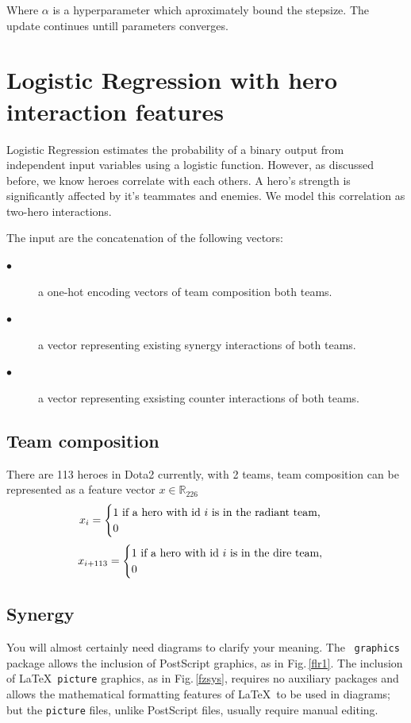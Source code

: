 \documentclass[12pt,openany,a4paper]{book}
\newcommand{\fig}[1]  {Fig.\,\ref{#1}}		%
\begin{document}
Where $\alpha$ is a hyperparameter which aproximately bound the stepsize. The update continues untill parameters converges.
\chapter{Logistic Regression with hero interaction features}

Logistic Regression estimates the probability of a binary output from independent input variables using a logistic function. However, as discussed before, we know heroes correlate with each others. A hero's strength is significantly affected by it's teammates and enemies. We model this correlation as two-hero interactions.

The input are the concatenation of the following vectors: 
\begin{description}
  \item[$\bullet$] a one-hot encoding vectors of team composition both teams.
  \item[$\bullet$] a vector representing existing synergy interactions of both teams.
  \item[$\bullet$] a vector representing exsisting counter interactions of both teams.
\end{description}

\section{Team composition}
There are 113 heroes in Dota2 currently, with 2 teams, team composition can be represented as a feature vector $x\in\mathbb{R}_{226}$
\[
	x_{i}=\begin{cases}
			1 $ if a hero with id $i$ is in the radiant team,$\\
			0
	    \end{cases}
\]	
\[
	x_{i+113}=\begin{cases}
			1 $ if a hero with id $i$ is in the dire team,$\\
			0
	    \end{cases}
\]	

\section{Synergy}



You will almost certainly need diagrams to clarify your meaning.  The
\LaTeXe\ \texttt{graphics} package allows the inclusion of PostScript
graphics, as in \fig{flr1}.  The inclusion of \LaTeX\ \texttt{picture}
graphics, as in \fig{fzsys}, requires no auxiliary packages and allows
the mathematical formatting features of \LaTeX\ to be used in
diagrams; but the \texttt{picture} files, unlike PostScript files,
usually require manual editing.
\end{document}
